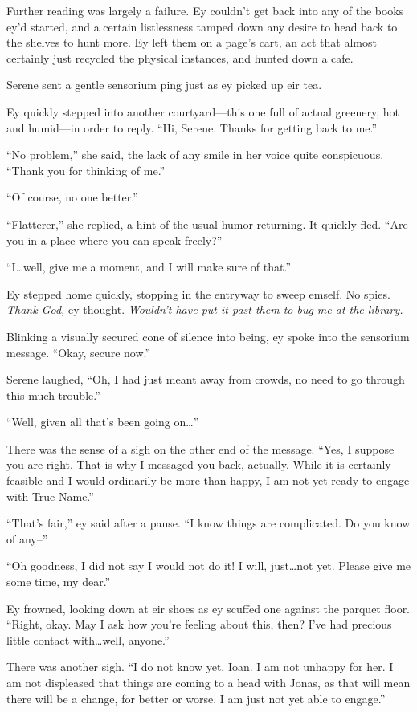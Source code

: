 Further reading was largely a failure. Ey couldn't get back into any of the books ey'd started, and a certain listlessness tamped down any desire to head back to the shelves to hunt more. Ey left them on a page's cart, an act that almost certainly just recycled the physical instances, and hunted down a cafe.

Serene sent a gentle sensorium ping just as ey picked up eir tea.

Ey quickly stepped into another courtyard—this one full of actual greenery, hot and humid—in order to reply. ``Hi, Serene. Thanks for getting back to me.''

``No problem,'' she said, the lack of any smile in her voice quite conspicuous. ``Thank you for thinking of me.''

``Of course, no one better.''

``Flatterer,'' she replied, a hint of the usual humor returning. It quickly fled. ``Are you in a place where you can speak freely?''

``I\ldots well, give me a moment, and I will make sure of that.''

Ey stepped home quickly, stopping in the entryway to sweep emself. No spies. \emph{Thank God,} ey thought. \emph{Wouldn't have put it past them to bug me at the library.}

Blinking a visually secured cone of silence into being, ey spoke into the sensorium message. ``Okay, secure now.''

Serene laughed, ``Oh, I had just meant away from crowds, no need to go through this much trouble.''

``Well, given all that's been going on\ldots{}''

There was the sense of a sigh on the other end of the message. ``Yes, I suppose you are right. That is why I messaged you back, actually. While it is certainly feasible and I would ordinarily be more than happy, I am not yet ready to engage with True Name.''

``That's fair,'' ey said after a pause. ``I know things are complicated. Do you know of any--''

``Oh goodness, I did not say I would not do it! I will, just\ldots not yet. Please give me some time, my dear.''

Ey frowned, looking down at eir shoes as ey scuffed one against the parquet floor. ``Right, okay. May I ask how you're feeling about this, then? I've had precious little contact with\ldots well, anyone.''

There was another sigh. ``I do not know yet, Ioan. I am not unhappy for her. I am not displeased that things are coming to a head with Jonas, as that will mean there will be a change, for better or worse. I am just not yet able to engage.''

